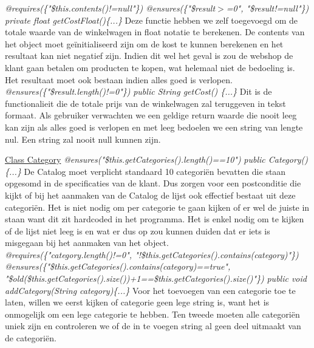 \documentclass{article}
\begin{document}
\noindent
\textit{@requires(\{"\$this.contents()!=null"\})}\newline
\textit{@ensures(\{"\$result$>$=0", "\$result!=null"\})}\newline
\textit{private float getCostFloat()\{...\}}\newline
Deze functie hebben we zelf toegevoegd om de totale waarde van de winkelwagen in float notatie te berekenen. De contents van het object moet ge\"{i}nitialiseerd zijn om de kost te kunnen berekenen en het resultaat kan niet negatief zijn. Indien dit wel het geval is zou de webshop de klant gaan betalen om producten te kopen, wat helemaal niet de bedoeling is. Het resultaat moet ook bestaan indien alles goed is verlopen.\\

\noindent
\textit{@ensures(\{"\$result.length()!=0"\})}\newline
\textit{public String getCost() \{...\}}\newline
Dit is de functionalieit die de totale prijs van de winkelwagen zal teruggeven in tekst formaat. Als gebruiker verwachten we een geldige return waarde die nooit leeg kan zijn als alles goed is verlopen en met leeg bedoelen we een string van lengte nul. Een string zal nooit null kunnen zijn.\\

\newpage

\noindent
\underline{Class Category}\newline
\textit{@ensures("\$this.getCategories().length()==10")}\newline
\textit{public Category()\{...\}}\newline
De Catalog moet verplicht standaard 10 categori\"{e}n bevatten die staan opgesomd in de specificaties van de klant. Dus zorgen voor een postconditie die kijkt of bij het aanmaken van de Catalog de lijst ook effectief bestaat uit deze categori\"{e}n. Het is niet nodig om per categorie te gaan kijken of er wel de juiste in staan want dit zit hardcoded in het programma. Het is enkel nodig om te kijken of de lijst niet leeg is en wat er dus op zou kunnen duiden dat er iets is misgegaan bij het aanmaken van het object.\\

\noindent
\textit{@requires(\{"category.length()!=0", "!\$this.getCategories().contains(category)"\})}\newline
\textit{@ensures(\{"\$this.getCategories().contains(category)==true", "\$old(\$this.getCategories().size())+1==\$this.getCategories().size()"\})}\newline
\textit{public void addCategory(String category)\{...\}}\newline
Voor het toevoegen van een categorie toe te laten, willen we eerst kijken of categorie geen lege string is, want het is onmogelijk om een lege categorie te hebben. Ten tweede moeten alle categori\"{e}n uniek zijn en controleren we of de in te voegen string al geen deel uitmaakt van de categori\"{e}n. \\
\end{document}
